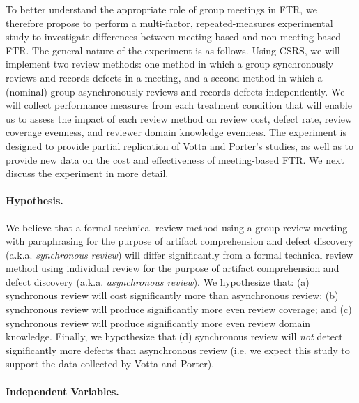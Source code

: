 To better understand the appropriate role of group meetings in FTR, we
therefore propose to perform a multi-factor, repeated-measures experimental
study to investigate differences between meeting-based and non-meeting-based
FTR.  The general nature of the experiment is as follows. Using CSRS, we
will implement two review methods: one method in which a group
synchronously reviews and records defects in a meeting, and a second method
in which a (nominal) group asynchronously reviews and records defects
independently.  We will collect performance measures from each treatment
condition that will enable us to assess the impact of each review method on
review cost, defect rate, review coverage evenness, and reviewer domain
knowledge evenness.  The experiment is designed to provide partial
replication of Votta and Porter's studies, as well as to provide new data
on the cost and effectiveness of meeting-based FTR.  We next discuss the
experiment in more detail.


\paragraph {Hypothesis.}

We believe that a formal technical review method using a group review
meeting with paraphrasing for the purpose of artifact comprehension and
defect discovery (a.k.a. {\em synchronous review}) will differ
significantly from a formal technical review method using individual review
for the purpose of artifact comprehension and defect discovery (a.k.a. {\em
asynchronous review}).  We hypothesize that: (a) synchronous review will cost
significantly more than asynchronous review; (b) synchronous review will produce
significantly more even review coverage; and (c) synchronous review will produce
significantly more even review domain knowledge. Finally, we hypothesize
that (d) synchronous review will {\em not} detect significantly more defects than
asynchronous review (i.e. we expect this study to support the data collected
by Votta and Porter).

\paragraph {Independent Variables.}

